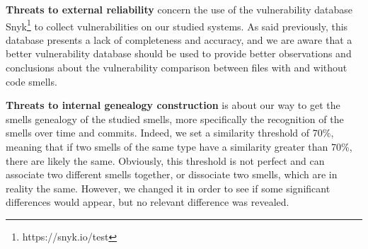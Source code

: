 {\color{blue}
\textbf{Threats to external reliability} concern the use of the vulnerability database Snyk\footnote{https://snyk.io/test} to collect vulnerabilities on our studied systems. As said previously, this database presents a lack of completeness and accuracy, and we are aware that a better vulnerability database should be used to provide better observations and conclusions about the vulnerability comparison between files with and without code smells.

\textbf{Threats to internal genealogy construction} is about our way to get the smells genealogy of the studied smells, more specifically the recognition of the smells over time and commits. Indeed, we set a similarity threshold of 70\%, meaning that if two smells of the same type have a similarity greater than 70\%, there are likely the same. Obviously, this threshold is not perfect and can associate two different smells together, or dissociate two smells, which are in reality the same. However, we changed it in order to see if some significant differences would appear, but no relevant difference was revealed.
	
}